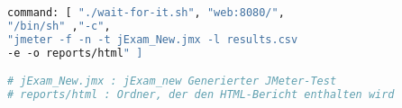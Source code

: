 \begin{lstlisting}[language=Dockerfile,label={lst:jmeter},caption={JMeter Ausführungsbefehl}]
    command: [ "./wait-for-it.sh", "web:8080/",
"/bin/sh" ,"-c",
"jmeter -f -n -t jExam_New.jmx -l results.csv
-e -o reports/html" ]

# jExam_New.jmx : jExam_new Generierter JMeter-Test
# reports/html : Ordner, der den HTML-Bericht enthalten wird
\end{lstlisting}
